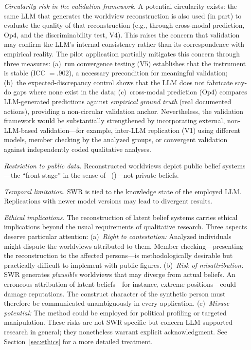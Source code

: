 \documentclass[11pt,a4paper]{article}
\theoremstyle{definition}
\theoremstyle{plain}
\theoremstyle{remark}
\begin{document}
\emph{Circularity risk in the validation framework.} A potential circularity exists: the same LLM that generates the worldview reconstruction is also used (in part) to evaluate the quality of that reconstruction (e.g., through cross-modal prediction, Op4, and the discriminability test, V4). This raises the concern that validation may confirm the LLM's internal consistency rather than its correspondence with empirical reality. The pilot application partially mitigates this concern through three measures: (a)~run convergence testing (V5) establishes that the instrument is stable (ICC $= .902$), a necessary precondition for meaningful validation; (b)~the expected-discrepancy control shows that the LLM does not fabricate say-do gaps where none exist in the data; (c)~cross-modal prediction (Op4) compares LLM-generated predictions against \emph{empirical ground truth} (real documented actions), providing a non-circular validation anchor. Nevertheless, the validation framework would be substantially strengthened by incorporating external, non-LLM-based validation---for example, inter-LLM replication (V1) using different models, member checking by the analyzed groups, or convergent validation against independently coded qualitative analyses.

\emph{Restriction to public data.} Reconstructed worldviews depict public belief systems---the ``front stage'' in the sense of \citeauthor{Goffman1959}~(\citeyear{Goffman1959})---not private beliefs.

\emph{Temporal limitation.} SWR is tied to the knowledge state of the employed LLM. Replications with newer model versions may lead to divergent results.

\emph{Ethical implications.} The reconstruction of latent belief systems carries ethical implications beyond the usual requirements of qualitative research. Three aspects deserve particular attention: (a)~\emph{Right to contestation:} Analyzed individuals might dispute the worldviews attributed to them. Member checking---presenting the reconstruction to the affected persons---is methodologically desirable but practically difficult to implement with public figures. (b)~\emph{Risk of misattribution:} SWR generates \emph{plausible} worldviews that may diverge from actual beliefs. An erroneous attribution of latent beliefs---for instance, extreme positions---could damage reputations. The construct character of the synthetic person must therefore be communicated unambiguously in every application. (c)~\emph{Misuse potential:} The method could be employed for political profiling or targeted manipulation. These risks are not SWR-specific but concern LLM-supported research in general; they nonetheless warrant explicit acknowledgment. See Section~\ref{sec:ethics} for a more detailed treatment.
\end{document}
